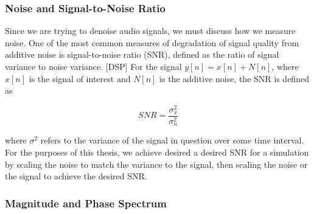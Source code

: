 \subsubsection{Noise and Signal-to-Noise Ratio}
Since we are trying to denoise audio signals, we must discuss how we measure noise. One of the most common measures of degradation of signal quality from additive noise is signal-to-noise ratio (SNR), defined as the ratio of signal variance to noise variance. [DSP] For the signal $y[n] = x[n] + N[n]$, where $x[n]$ is the signal of interest and $N[n]$ is the additive noise, the SNR is defined as

\begin{equation}
SNR = \dfrac{\sigma_{x}^2}{\sigma_{n}^2}
\end{equation}

where $\sigma^{2}$ refers to the variance of the signal in question over some time interval. For the purposes of this thesis, we achieve desired a desired SNR for a simulation by scaling the noise to match the variance to the signal, then scaling the noise or the signal to achieve the desired SNR. %

\subsubsection{Magnitude and Phase Spectrum}
